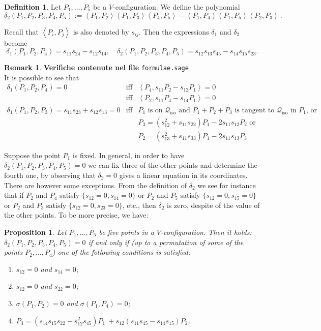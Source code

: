 \documentclass{amsart}
\theoremstyle{plain}
\newtheorem{prop}[lemma]{Proposition}
\theoremstyle{definition}
\newtheorem{definition}[lemma]{Definition}
\newtheorem{rmk}[lemma]{Remark}
\newcommand{\iso}{\mathcal{Q}_{\mathrm{iso}}}
\newcommand{\scl}[2]{\left\langle {#1}, {#2} \right\rangle}
\begin{document}
\begin{definition}
 Let $P_1, \dots, P_5$ be a $V$-configuration.
We define the polynomial
 \[
  \delta_2(P_1, P_2, P_3, P_4, P_5) :=
  \scl{P_1}{P_2} \scl{P_1}{P_3} \scl{P_4}{P_5} -
  \scl{P_1}{P_4} \scl{P_1}{P_5} \scl{P_2}{P_3} \,.
 \]
\end{definition}
Recall that $\scl{P_i}{P_j}$ is also denoted by $s_{ij}$.
Then the expressions $\delta_1$ and $\delta_2$ become
\[
\delta_1(P_1, P_2, P_4) = s_{11} s_{24}-s_{12}s_{14},
\quad \delta_2(P_1, P_2, P_3, P_4, P_5) =s_{12}s_{13}s_{45}-s_{14}s_{15} s_{23}.
\]
%
\begin{rmk}
\label{rmk:characteristics_d1_d2}
\textbf{Verifiche contenute nel file} \verb+formulae.sage+ \\
It is possible to see that
%
\begin{eqnarray}
\label{rmk_delta_case1}
\delta_1(P_1, P_2, P_4) =0  &\mbox{iff} &\scl{P_4}{s_{11}P_2-s_{12}P_1} = 0\\
&\mbox{iff} &\scl{P_2}{s_{11}P_4-s_{14}P_1} = 0\\
\label{rmk_delta_case2}
\overline{\delta}_1(P_1, P_2, P_3) = s_{11} s_{23}+s_{12}s_{13}=0 &\mbox{iff}&
P_1 \mbox{ is on~$\iso$ and } P_1 + P_2 + P_3 \mbox{ is tangent to~$\iso$ in $P_1$, or} \\
&& P_3 = (s_{12}^2+s_{11}s_{22})P_1-2s_{11}s_{12}P_2 \mbox{ or} \nonumber \\
&& P_2 = (s_{13}^2+s_{11}s_{33})P_1-2s_{11}s_{13}P_3 \nonumber
\end{eqnarray}

\end{rmk}
Suppose the point $P_1$ is fixed. In general, in order to have
$\delta_2(P_1, P_2, P_3, P_4, P_5) = 0$ we can fix three of the other points
and determine the fourth one, by observing
that $\delta_2=0$ gives a linear equation in its coordinates. There are
however
some exceptions. From the definition of $\delta_2$ we see for instance that
if $P_2$ and $P_4$ satisfy $\{s_{12}=0, s_{14}=0\}$ or $P_2$ and
$P_5$ satisfy $\{s_{12}=0, s_{15}=0\}$ or $P_2$ and $P_3$ satisfy
$\{s_{12}=0, s_{23}=0\}$, etc., then $\delta_2$ is zero,
despite of the value of the other points. To be more precise, we have:
%
\begin{prop}
\label{prop:definitionP3}
Let $P_1, \dots, P_5$ be five points in a $V$-configuration. Then it holds:
$\delta_2(P_1, P_2, P_3, P_4, P_5) = 0$ if and only if (up to a permutation
of some of the points $P_2, \dots, P_4$) one of the following conditions
is satisfied:
\begin{enumerate}
\item $s_{12} = 0$ and $s_{14} = 0$;
\label{defP3_1}
\item $s_{12} = 0$ and $s_{22} = 0$;
\label{defP3_2}
\item $\sigma(P_1, P_2) = 0$ and $\sigma(P_1, P_4) = 0$;
\label{defP3_3}
\item $P_3 = (s_{14}s_{15}s_{22}-s_{12}^2s_{45})P_1 \
  +s_{12}(s_{11}s_{45}-s_{14}s_{15})P_2$.
\label{defP3_4}
\end{enumerate}
\end{prop}
\end{document}
